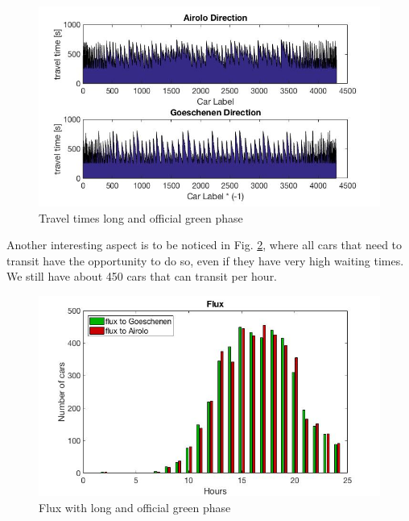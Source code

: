 \documentclass[11pt,a4paper,parskip=half-]{article}
\begin{document}
\begin{figure}[h!]
\includegraphics[scale=0.60]{traveltimeslongreal}
\centering
\vspace*{-4mm}
\caption{Travel times long and official green phase}
\label{fig:traveltimes300_40}
\end{figure}

\clearpage

Another interesting aspect is to be noticed in Fig. \ref{fig:flux300_40}, where all cars that need to transit have the opportunity to do so, even if they have very high waiting times. We still have about 450 cars that can transit per hour. 




\begin{figure}[h!]
\includegraphics[scale=0.65]{fluxlongreal}
\centering
\vspace*{-4mm}
\caption{Flux with long and official green phase}
\label{fig:flux300_40}
\end{figure}
\end{document}
